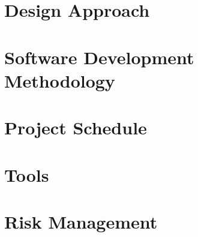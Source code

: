 \section{Design Approach}
\label{design_approach}


\section{Software Development Methodology}
\label{software_development_methodology}


\section{Project Schedule}
\label{project_schedule}


\section{Tools}
\label{tools}


\section{Risk Management}
\label{risk_management}

